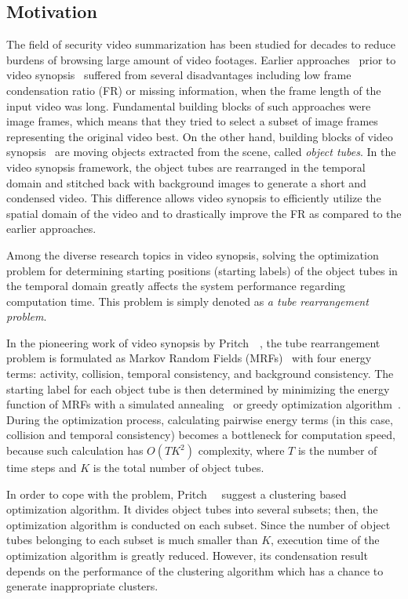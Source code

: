 \documentclass[11pt]{hyu_thesis}
\begin{document}
\subsection{Motivation}
\label{sec:intro:motivation}
The field of security video summarization has been studied for decades to reduce burdens of browsing large amount of video footages. Earlier approaches~\cite{Smith1998,Petrovic2005,Hoferlin2011} prior to video synopsis~\cite{Rav-Acha2006,Pritch2007,Pritch2008} suffered from several disadvantages including low frame condensation ratio (FR) or missing information, when the frame length of the input video was long. Fundamental building blocks of such approaches were image frames, which means that they tried to select a subset of image frames representing the original video best. On the other hand, building blocks of video synopsis~\cite{Rav-Acha2006,Pritch2007,Pritch2008} are moving objects extracted from the scene, called \textit{object tubes}. In the video synopsis framework, the object tubes are rearranged in the temporal domain and stitched back with background images to generate a short and condensed video. This difference allows video synopsis to efficiently utilize the spatial domain of the video and to drastically improve the FR as compared to the earlier approaches.

Among the diverse research topics in video synopsis, solving the optimization problem for determining starting positions (starting labels) of the object tubes in the temporal domain greatly affects the system performance regarding computation time. This problem is simply denoted as \textit{a tube rearrangement problem}.

In the pioneering work of video synopsis by Pritch~\etal~\cite{Pritch2008}, the tube rearrangement problem is formulated as Markov Random Fields (MRFs)~\cite{Kolmogorov2004} with four energy terms: activity, collision, temporal consistency, and background consistency. The starting label for each object tube is then determined by minimizing the energy function of MRFs with a simulated annealing~\cite{Kirkpatrick1983} or greedy optimization algorithm~\cite{Cormen2009}. During the optimization process, calculating pairwise energy terms (in this case, collision and temporal consistency) becomes a bottleneck for computation speed, because such calculation has $O(TK^2)$ complexity, where $T$ is the number of time steps and $K$ is the total number of object tubes.

In order to cope with the problem, Pritch~\etal~\cite{Pritch2009} suggest
a clustering based optimization algorithm. It divides object tubes into several subsets; then, the optimization algorithm is conducted on each subset. Since the number of object tubes belonging to each subset is much smaller than $K$, execution time of the optimization algorithm is greatly reduced. However, its condensation result depends on the performance of the clustering algorithm which has a chance to
generate inappropriate clusters.
\end{document}
